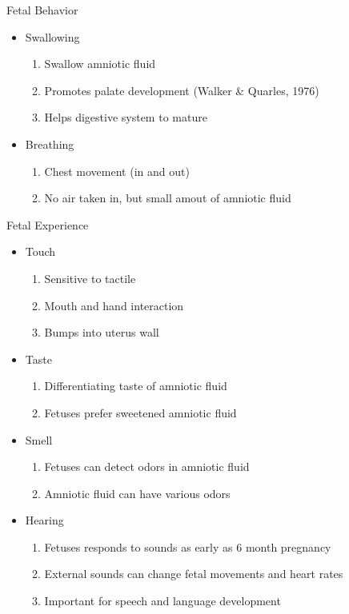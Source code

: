 \documentclass{beamer} %
\begin{document}
\begin{frame}{Fetal Behavior}
\begin{itemize}
    \item Swallowing
    \begin{enumerate}
        \item Swallow amniotic fluid
        \item Promotes palate development (Walker & Quarles, 1976)
        \item Helps digestive system to mature
    \end{enumerate}
    \pause
    \item Breathing
    \begin{enumerate}
        \item Chest movement (in and out)
        \item No air taken in, but small amout of amniotic fluid
    \end{enumerate}
\end{itemize}
\end{frame}
\begin{frame}{Fetal Experience}
\begin{itemize}
    \item Touch
    \begin{enumerate}
        \item Sensitive to tactile
        \item Mouth and hand interaction
        \item Bumps into uterus wall 
    \end{enumerate}
    \pause
    \item Taste
    \begin{enumerate}
        \item Differentiating taste of amniotic fluid
        \item Fetuses prefer sweetened amniotic fluid 
    \end{enumerate}
    \pause
    \item Smell
    \begin{enumerate}
        \item Fetuses can detect odors in amniotic fluid
        \item Amniotic fluid can have various odors
    \end{enumerate}
    \pause
    \item Hearing
    \begin{enumerate}
        \item Fetuses responds to sounds as early as 6 month pregnancy
        \item External sounds can change fetal movements and heart rates
        \item Important for speech and language development
    \end{enumerate}
\end{itemize}
\end{frame}
\end{document}
